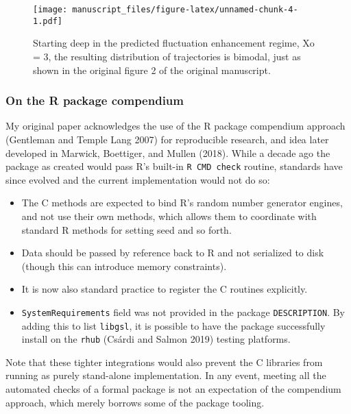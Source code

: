 \documentclass[
]{rescience}
\providecommand{\tightlist}{%
  \setlength{\itemsep}{0pt}\setlength{\parskip}{0pt}}
\begin{document}
\begin{figure}
\centering
\texttt{[image: manuscript\_files/figure-latex/unnamed-chunk-4-1.pdf]}
\caption{Starting deep in the predicted fluctuation enhancement regime,
Xo = 3, the resulting distribution of trajectories is bimodal, just as
shown in the original figure 2 of the original manuscript.}
\end{figure}

\hypertarget{on-the-r-package-compendium}{%
\subsubsection{On the R package
compendium}\label{on-the-r-package-compendium}}

My original paper acknowledges the use of the R package compendium
approach (Gentleman and Temple Lang 2007) for reproducible research, and
idea later developed in Marwick, Boettiger, and Mullen (2018). While a
decade ago the package as created would pass R's built-in
\texttt{R\ CMD\ check} routine, standards have since evolved and the
current implementation would not do so:

\begin{itemize}
\tightlist
\item
  The C methods are expected to bind R's random number generator
  engines, and not use their own methods, which allows them to
  coordinate with standard R methods for setting seed and so forth.\\
\item
  Data should be passed by reference back to R and not serialized to
  disk (though this can introduce memory constraints).\\
\item
  It is now also standard practice to register the C routines
  explicitly.\\
\item
  \texttt{SystemRequirements} field was not provided in the package
  \texttt{DESCRIPTION}. By adding this to list \texttt{libgsl}, it is
  possible to have the package successfully install on the \texttt{rhub}
  (Csárdi and Salmon 2019) testing platforms.
\end{itemize}

Note that these tighter integrations would also prevent the C libraries
from running as purely stand-alone implementation. In any event, meeting
all the automated checks of a formal package is not an expectation of
the compendium approach, which merely borrows some of the package
tooling.
\end{document}
